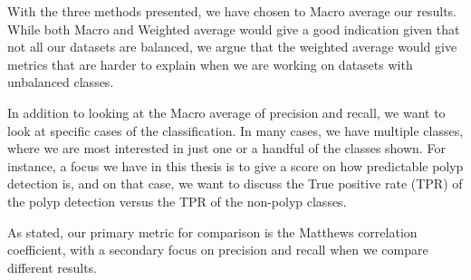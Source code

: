 With the three methods presented, we have chosen to Macro average our results. While both Macro and Weighted average would give a good indication given that not all our datasets are balanced, we argue that the weighted average would give metrics that are harder to explain when we are working on datasets with unbalanced classes.

In addition to looking at the Macro average of precision and recall, we want to look at specific cases of the classification.  In many cases, we have multiple classes, where we are most interested in just one or a handful of the classes shown. 
For instance, a focus we have in this thesis is to give a score on how predictable polyp detection is, and on that case, we want to discuss the True positive rate (TPR) of the polyp detection versus the TPR of the non-polyp classes. 

As stated, our primary metric for comparison is the Matthews correlation coefficient, with a secondary focus on precision and recall when we compare different results.

